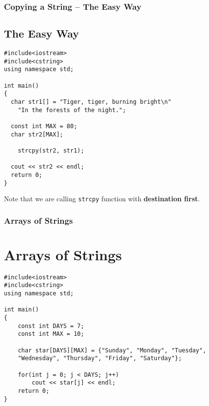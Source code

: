 \documentclass{beamer}
\begin{document}
\begin{frame}[fragile]\frametitle{Copying a String -- The Easy Way}
    \subsection{The Easy Way} %
    \label{sub:the_easy_way}
    \lstset{style=mystyle}
\begin{lstlisting}
#include<iostream>
#include<cstring>
using namespace std;

int main()
{
  char str1[] = "Tiger, tiger, burning bright\n"
    "In the forests of the night.";

  const int MAX = 80;
  char str2[MAX];

    strcpy(str2, str1);

  cout << str2 << endl;
  return 0;
}
\end{lstlisting}
    Note that we are calling \texttt{strcpy} function with \textbf{destination first}.
\end{frame}

\begin{frame}[fragile]\frametitle{Arrays of Strings}
    \section{Arrays of Strings} %
    \label{sec:arrays_of_strings}
    \lstset{style=mystyle}
\begin{lstlisting}
#include<iostream>
#include<cstring>
using namespace std;

int main()
{
    const int DAYS = 7;
    const int MAX = 10;

    char star[DAYS][MAX] = {"Sunday", "Monday", "Tuesday",
    "Wednesday", "Thursday", "Friday", "Saturday"};

    for(int j = 0; j < DAYS; j++)
        cout << star[j] << endl;
    return 0;
}
\end{lstlisting}
\end{frame}
\end{document}
